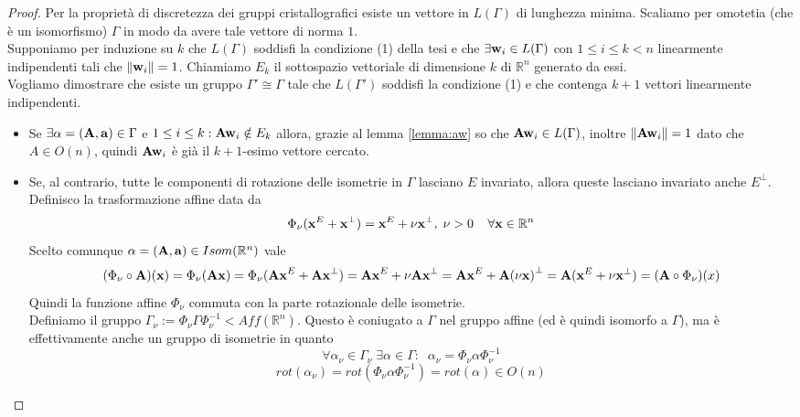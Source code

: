 \documentclass[a4paper,11pt,openright,twoside	]{book}
\begin{document}
\begin{proof}
Per la proprietà di discretezza dei gruppi cristallografici esiste un vettore in $L(\Gamma)$ di lunghezza minima. Scaliamo per omotetia (che è un isomorfismo) $\Gamma$ in modo da avere tale vettore di norma $1$. \\ 

Supponiamo per induzione su $k$ che $L(\Gamma)$ soddisfi la condizione (1) della tesi e che $\exists \vb{w}_i \in L(\Gamma)$ con $1 \leq i \leq k < n $ linearmente indipendenti tali che $\norm{\vb{w}_i} = 1 $.  
Chiamiamo $E_k$ il sottospazio vettoriale di dimensione $k$ di $\mathbb{R}^n$ generato da essi.\\
Vogliamo dimostrare che esiste un gruppo $\Gamma ' \cong \Gamma$ tale che $L(\Gamma')$ soddisfi la condizione (1) e che contenga $k+1$ vettori linearmente indipendenti. 
\begin{itemize}
\item Se $\exists \alpha = (\vb{A, a}) \in \Gamma $ e $1 \leq i \leq k: \vb{Aw}_i \notin E_k$ allora, grazie al lemma \ref{lemma:aw} so che $\vb{Aw}_i \in L(\Gamma)$, inoltre $\norm{\vb{Aw}_i} = 1$ dato che $A \in O(n)$, quindi $\vb{Aw}_i$ è già il $k+1$-esimo vettore cercato.
\item Se, al contrario, tutte le componenti di rotazione delle isometrie in $\Gamma$ lasciano $E$ invariato, allora queste lasciano invariato anche $E^{\perp}$. \\
Definisco la trasformazione affine data da
\[ \Phi_{\nu} (\vb{x}^E + \vb{x}^{\perp} )=  \vb{x}^E + \nu \vb{x}^{\perp} , \; \nu > 0  \; \; \; \; \forall \vb{x} \in \mathbb{R}^n\]
Scelto comunque $\alpha = (\vb{A,a}) \in Isom(\mathbb{R}^n)$ vale
\[ ( \Phi_{\nu}  \circ \vb{A})(\vb{x}) = \Phi_{\nu} (\vb{Ax})  = \Phi_{\nu} (\vb{Ax}^E +\vb{Ax }^{\perp})  = \vb{Ax}^E +\nu \vb{Ax }^{\perp} = \vb{Ax}^E +\vb{A(\nu x) }^{\perp} = \vb{A} ( \vb{x}^E +\nu \vb{x }^{\perp})  = ( \vb{A} \circ \Phi_{\nu} ) (x)\]
Quindi la funzione affine $\Phi_{\nu}$ commuta con la parte rotazionale delle isometrie. \\
Definiamo il gruppo $\Gamma_{\nu} := \Phi_{\nu} \Gamma \Phi_{\nu}^{-1} < Aff(\mathbb{R}^n)$. Questo è coniugato a $\Gamma$ nel gruppo affine (ed è quindi isomorfo a $\Gamma$), ma è effettivamente anche un gruppo di isometrie in quanto 
\[ \forall \alpha_{\nu} \in \Gamma_{\nu} \; \exists \alpha \in \Gamma : \; \; \alpha_{\nu} =  \Phi_{\nu} \alpha \Phi_{\nu}^{-1}  \]
\[ rot( \alpha_{\nu}) = rot(\Phi_{\nu} \alpha \Phi_{\nu}^{-1}) = rot(\alpha) \in O(n)\]


\end{itemize}
\end{proof}
\end{document}
